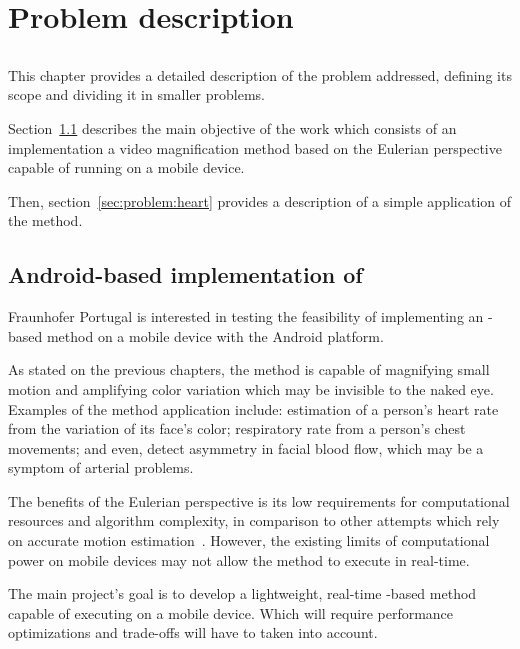 \chapter{Problem description} \label{chap:problem}

\section*{}


This chapter provides a detailed description of the problem addressed, defining
its scope and dividing it in smaller problems.

Section~\ref{sec:problem:evm} describes the main objective of the work which
consists of an implementation a video magnification method based on the
Eulerian perspective capable of running on a mobile device.

Then, section~\ref{sec:problem:heart} provides a description of a simple
application of the \evm{} method.

\section{Android-based implementation of \evm} \label{sec:problem:evm}

Fraunhofer Portugal is interested in testing the feasibility of implementing an
\evm{}-based method on a mobile device with the Android platform.

As stated on the previous chapters,
the \evm{} method is capable of magnifying small
motion and amplifying color variation which may be invisible to the naked eye.
Examples of the method application include:
estimation of a person's heart rate from the variation of its face's color;
respiratory rate from a person's chest movements;
and even, detect asymmetry in facial blood flow, which may be a symptom of
arterial problems.

The benefits of the Eulerian perspective is its low requirements for
computational resources and algorithm complexity, in comparison to other
attempts which rely on accurate motion estimation~\cite{Liu2005Motion}.
However, the existing limits of computational power on mobile devices
may not allow the \evm{} method to execute in real-time.

The main project's goal is to develop a lightweight, real-time \evm{}-based
method capable of executing on a mobile device. Which will require
performance optimizations and trade-offs will have to taken into account.

